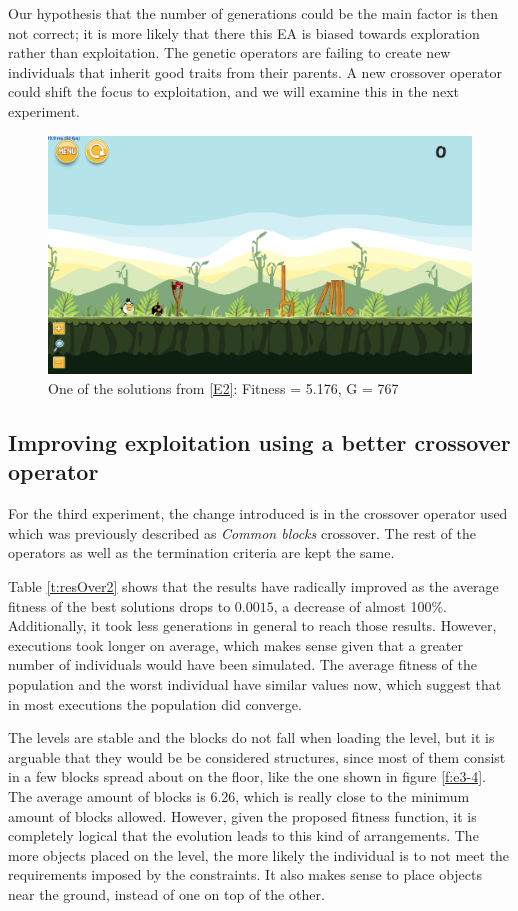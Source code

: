 \documentclass[sigconf]{acmart}
\begin{document}
Our hypothesis that the number of generations could be the main factor
is then not correct; it is more likely that there this EA is biased towards 
exploration rather than exploitation. The genetic operators are failing to 
create new individuals that inherit good traits from their parents. A new 
crossover operator could shift the focus to exploitation, and we will
examine this in the next experiment.
\begin{figure}
	\centering
	\includegraphics[scale=0.2]{level-0-base_large180529_223045.png}
	\caption{One of the solutions from \ref{E2}: Fitness = 5.176, G = 767  
	}\label{f:e2-4}
\end{figure}
\subsection{Improving exploitation using a better crossover operator}\label{E3}

For the third experiment, the change introduced is in the crossover operator 
used which was previously described as \textit{Common blocks} crossover. 
The rest of the operators as 
well as the termination criteria are kept the same. 

Table \ref{t:resOver2} shows that the results have radically improved as the 
average fitness of the best solutions drops to $0.0015$, a decrease of almost 
100\%. Additionally, it took less generations in general to reach those 
results. However, executions took longer on average, which makes sense given 
that a greater number of individuals would have been simulated. The average 
fitness of the population and the worst individual have similar values now, 
which suggest that in most executions the population did converge.

The levels are stable and the blocks do not fall when loading the level, but 
it is arguable that they would be be considered structures, since most of them 
consist in a 
few blocks spread about on the floor, like the one shown in figure \ref{f:e3-4}.
The average amount of blocks is $6.26$, 
which is really close to the minimum amount of blocks allowed. However, given 
the proposed fitness function, it is completely logical that the evolution 
leads to this kind of arrangements. The more objects placed on the level, the 
more likely the individual is to not meet the requirements imposed by the 
constraints. It also makes sense to place objects near the ground, instead of 
one on top of the other.
\end{document}
